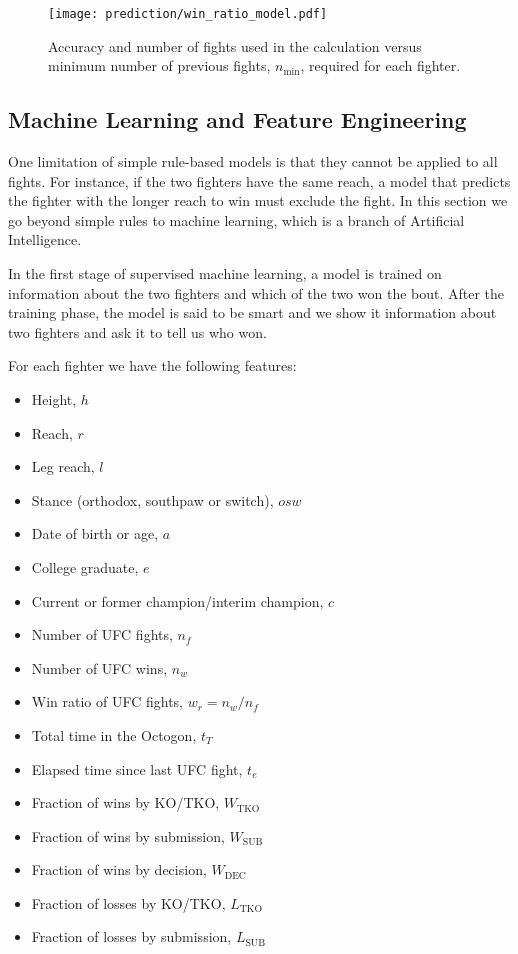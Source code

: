 \begin{figure}[h]
\begin{center}
\texttt{[image: prediction/win\_ratio\_model.pdf]}
\caption{Accuracy and number of fights used in the calculation
versus minimum number of previous fights, $n_{\textrm{min}}$, required for each fighter.}
\label{win_ratio_wins}
\end{center}
\end{figure}

\clearpage
\subsection*{Machine Learning and Feature Engineering}

One limitation of simple rule-based models is that they
cannot be applied to all fights. For instance, if the two fighters
have the same reach, a model that predicts the fighter with the longer
reach to win must exclude the fight.
In this section we go beyond simple rules to machine learning,
which is a branch of Artificial Intelligence.

In the first stage of supervised machine learning, a model
is trained on information about the two fighters
and which of the two won the bout. After the training phase,
the model is said to be smart and we show it information about
two fighters and ask it to tell us who won.

For each fighter we have the following features:

\begin{itemize}[noitemsep]
  \item Height, $h$
  \item Reach, $r$
  \item Leg reach, $l$
  \item Stance (orthodox, southpaw or switch), $osw$
  \item Date of birth or age, $a$
  \item College graduate, $e$
  \item Current or former champion/interim champion, $c$
  \item Number of UFC fights, $n_f$
  \item Number of UFC wins, $n_w$
  \item Win ratio of UFC fights, $w_r=n_w/n_f$
  \item Total time in the Octogon, $t_T$
  \item Elapsed time since last UFC fight, $t_e$
  \item Fraction of wins by KO/TKO, $W_{\textrm{TKO}}$
  \item Fraction of wins by submission, $W_{\textrm{SUB}}$
  \item Fraction of wins by decision, $W_{\textrm{DEC}}$
  \item Fraction of losses by KO/TKO, $L_{\textrm{TKO}}$
  \item Fraction of losses by submission, $L_{\textrm{SUB}}$
\end{itemize}

